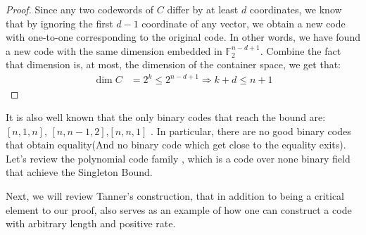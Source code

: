 \documentclass[12pt,a4paper]{article}
\begin{document}
\begin{proof} Since any two codewords of $C$ differ by at least $d$ coordinates, we know that by ignoring the first $d-1$ coordinate of any vector, we obtain a new code with one-to-one corresponding to the original code. In other words, we have found a new code with the same dimension embedded in $\mathbb{F}_{2}^{n-d+1}$. Combine the fact that dimension is, at most, the dimension of the container space, we get that:  
  \begin{equation*}
    \begin{split}
      \dim C &= 2^{k} \le 2^{n-d+1} \Rightarrow k+d \le n + 1
    \end{split}
  \end{equation*}
\end{proof}

It is also well known that the only binary codes that reach the bound are: $[n,1,n]$, $[n,n-1,2]$,$[n,n,1]$ \cite{eczoo_mds}. In particular, there are no good binary codes that obtain equality(And no binary code which get close to the equality exits). Let's review the polynomial code family \cite{Reed1960PolynomialCO}, which is a code over none binary field that achieve the Singleton Bound. 

Next, we will review Tanner's construction, that in addition to being a critical element to our proof, also serves as an example of how one can construct a code with arbitrary length and positive rate.
\end{document}
